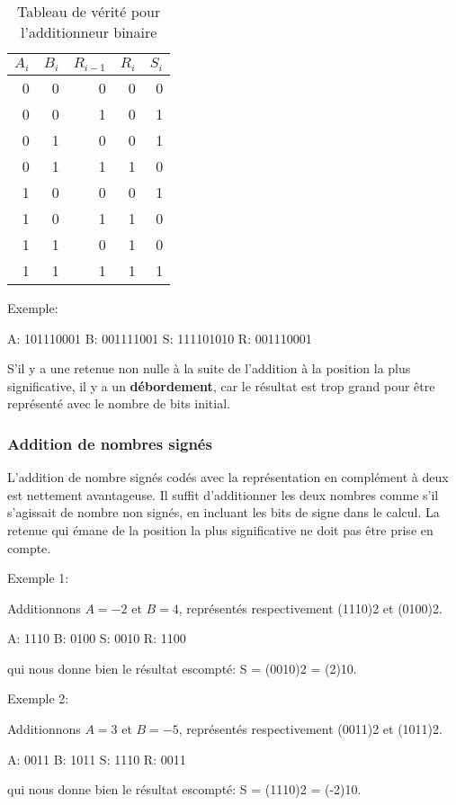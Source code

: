 \documentclass[11pt]{article}
\begin{document}
\begin{table}[htbp]
\caption{\label{tab:org4e6551e}Tableau de vérité pour l'additionneur binaire}
\centering
\begin{tabular}{rrrrr}
\(A_{i}\) & \(B_{i}\) & \(R_{i-1}\) & \(R_{i}\) & \(S_{i}\)\\
\hline
0 & 0 & 0 & 0 & 0\\
0 & 0 & 1 & 0 & 1\\
0 & 1 & 0 & 0 & 1\\
0 & 1 & 1 & 1 & 0\\
1 & 0 & 0 & 0 & 1\\
1 & 0 & 1 & 1 & 0\\
1 & 1 & 0 & 1 & 0\\
1 & 1 & 1 & 1 & 1\\
\end{tabular}
\end{table}


Exemple:

A: 101110001
B: 001111001
S: 111101010
R: 001110001

S'il y a une retenue non nulle à la suite de l'addition à la position
la plus significative, il y a un \textbf{débordement}, car le résultat est trop
grand pour être représenté avec le nombre de bits initial.

\subsubsection{Addition de nombres signés}
\label{sec:orgffa0d09}

L'addition de nombre signés codés avec la représentation en complément
à deux est nettement avantageuse. Il suffit d’additionner les deux
nombres comme s'il s'agissait de nombre non signés, en incluant les
bits de signe dans le calcul. La retenue qui émane de la position la
plus significative ne doit pas être prise en compte. 

Exemple 1:

Additionnons \(A=-2\) et \(B=4\), représentés respectivement (1110)2 et (0100)2.

A: 1110
B: 0100
S: 0010
R: 1100

qui nous donne bien le résultat escompté: S = (0010)2 = (2)10.

Exemple 2:

Additionnons \(A=3\) et \(B=-5\), représentés respectivement (0011)2 et (1011)2.

A: 0011
B: 1011
S: 1110
R: 0011

qui nous donne bien le résultat escompté: S = (1110)2 = (-2)10.
\end{document}
